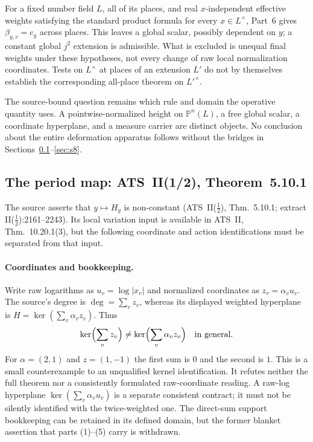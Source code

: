 \documentclass[11pt,a4paper]{article}
\theoremstyle{definition}
\theoremstyle{remark}
\begin{document}
For a fixed number field $L$, all of its places, and real $x$-independent
effective weights satisfying the standard product formula for every
$x\in L^\times$, Part~6 gives $\beta_{y,v}=c_y$ across places. This leaves
a global scalar, possibly dependent on $y$; a constant global $j^2$
extension is admissible. What is excluded is unequal final weights under
these hypotheses, not every change of raw local normalization coordinates.
Tests on $L^\times$ at places of an extension $L'$ do not by themselves
establish the corresponding all-place theorem on $L'^\times$.

The source-bound question remains which rule and domain the operative
quantity uses. A pointwise-normalized height on $\mathbb P^n(L)$, a free
global scalar, a coordinate hyperplane, and a measure carrier are distinct
objects. No conclusion about the entire deformation apparatus follows
without the bridges in Sections~\ref{sec:s18}--\ref{sec:s8}.

\subsection{The period map: ATS~II(1/2), Theorem~5.10.1}\label{sec:s18}

The source asserts that $y\mapsto H_y$ is non-constant (ATS~II($\tfrac12$),
Thm.~5.10.1; extract II($\tfrac12$):2161--2243). Its local variation input is
available in ATS~II, Thm.~10.20.1(3), but the following coordinate and action
identifications must be separated from that input.

\paragraph{Coordinates and bookkeeping.}
Write raw logarithms as $u_v=\log|x_v|$ and normalized coordinates as
$z_v=\alpha_v u_v$. The source's degree is $\deg=\sum_v z_v$, whereas its
displayed weighted hyperplane is $H=\ker(\sum_v\alpha_v z_v)$.
Thus
\[
 \ker\Bigl(\sum_v z_v\Bigr)\ne
 \ker\Bigl(\sum_v\alpha_v z_v\Bigr)
 \quad\hbox{in general}.
\]
For $\alpha=(2,1)$ and $z=(1,-1)$ the first sum is $0$ and the second is $1$.
This is a small counterexample to an unqualified kernel identification.
It refutes neither the full theorem nor a consistently formulated
raw-coordinate reading.
A raw-log hyperplane $\ker(\sum_v\alpha_v u_v)$ is a separate consistent
contract; it must not be silently identified with the twice-weighted one.
The direct-sum support bookkeeping can be retained in its defined domain,
but the former blanket assertion that parts (1)--(5) carry is withdrawn.
\end{document}
